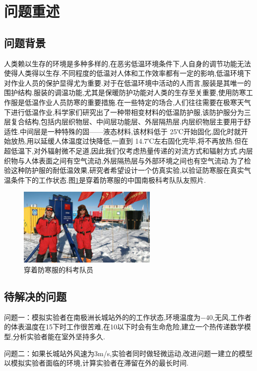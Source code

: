 \documentclass{whutmod}
\begin{document}
\section{问题重述}
\subsection{问题背景}
人类赖以生存的环境是多种多样的,在恶劣低温环境条件下,人自身的调节功能无法使得人类得以生存.不同程度的低温对人体和工作效率都有一定的影响,低温环境下对作业人员的保护显得尤为重要.对于在低温环境中活动的人而言,服装是其唯一的围护结构.服装的调温功能,尤其是保暖防护功能对人类的生存至关重要,使用防寒工作服是低温作业人员防寒的重要措施.在一些特定的场合,人们往往需要在极寒天气下进行低温作业,科学家们研究出了一种带相变材料的低温防护服,该防护服分为三层复合结构,包括内层织物层、中间层功能层、外层隔热层.内层织物层主要用于舒适性.中间层是一种特殊的固——液态材料,该材料低于 25℃开始固化,固化时就开始放热,用以延缓人体温度过快降低,一直到 14.7℃左右固化完毕,将不再放热.但在超低温下,对外辐射微不足道,因此我们仅考虑热量传递的对流方式和辐射方式.内层织物与人体表面之间有空气流动,外层隔热层与外部环境之间也有空气流动.为了检验这种防护服的耐低温效果,研究者希望设计一个仿真实验,以验证防寒服在真实气温条件下的工作状态.图\ref{clo}是穿着防寒服的中国南极科考队队友照片.
\begin{figure}[!htbp]
	\centering
	\includegraphics[width=0.6\textwidth]{clo.jpg}
	\caption{穿着防寒服的科考队员}
	\label{clo}
\end{figure}

\subsection{待解决的问题}
问题一：模拟实验者在南极洲长城站外的的工作状态,环境温度为$-40$\textcelsius,无风,工作者的体表温度在15\textcelsius 下时工作很苦难,在10\textcelsius 以下时会有生命危险,建立一个热传递数学模型,分析实验者能在室外坚持多久.

问题二：如果长城站外风速为3m/s,实验者同时做轻微运动,改进问题一建立的模型以模拟实验者面临的环境,计算实验者在滞留在外的最长时间.
\end{document}
